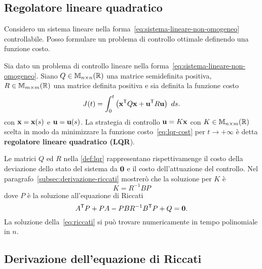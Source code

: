 \subsection{Regolatore lineare quadratico}
Considero un sistema lineare nella forma~\eqref{eq:sistema-lineare-non-omogeneo} controllabile.
Posso formulare un problema di controllo ottimale definendo una funzione costo.
\begin{definition}
    Sia dato un problema di controllo lineare nella forma~\eqref{eq:sistema-lineare-non-omogeneo}.
    Siano $Q \in \mathbb{M}_{n\times n}(\mathbb{R})$ una matrice semidefinita positiva, $R \in \mathbb{M}_{m\times m}(\mathbb{R})$ una matrice definita positiva
    e sia definita la funzione costo
    \begin{equation}
        J(t) = \int_0^t
            \left( \mathbf{x}^{\mathsf{T}} Q \mathbf{x} + \mathbf{u}^{\mathsf{T}} R \mathbf{u} \right)
        \ ds.
        \label{eq:lqr-cost}
    \end{equation}
    con $\mathbf{x} = \mathbf{x}(s)$ e $\mathbf{u} = \mathbf{u}(s)$.
    La strategia di controllo $\mathbf{u} = K\mathbf{x}$ con $K \in \mathbb{M}_{n\times m}(\mathbb{R})$ scelta in modo da
    minimizzare la funzione costo~\eqref{eq:lqr-cost} per $t \to +\infty$ è
    detta \textbf{regolatore lineare quadratico (\textsc{LQR}}).
    \label{def:lqr}
\end{definition}
Le matrici $Q$ ed $R$ nella \autoref{def:lqr} rappresentano rispettivamenge
il costo della deviazione dello stato del sistema da $\mathbf{0}$ e il costo dell'attuazione del
controllo.
Nel paragrafo~\ref{subsec:derivazione-riccati} mostrerò che la soluzione per $K$ è
\begin{equation}
    K = R^{-1}BP
    \label{eq:riccati-K}
\end{equation}
dove $P$ è la soluzione all'equazione di Riccati
\begin{equation}
        A^{\mathsf{T}} P + P A - P B R^{-1} B^{\mathsf{T}} P + Q = \mathbf{0}.
    \label{eq:riccati}
\end{equation}
La soluzione della~\eqref{eq:riccati} si può trovare numericamente in tempo polinomiale
in $n$.

\subsection{Derivazione dell'equazione di Riccati}

